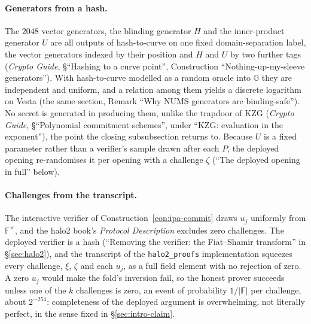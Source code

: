 \documentclass[11pt,a4paper]{article}
\theoremstyle{definition}
\newcommand{\F}{\mathbb{F}}
\newcommand{\G}{\mathbb{G}}
\begin{document}
\paragraph{Generators from a hash.}
The $2048$ vector generators, the blinding generator $H$ and the
inner-product generator $U$ are all outputs of hash-to-curve on one
fixed domain-separation label, the vector generators indexed by their
position and $H$ and $U$ by two further tags (\emph{Crypto Guide},
\S``Hashing to a curve point'', Construction ``Nothing-up-my-sleeve
generators''). With hash-to-curve modelled as a random oracle into $\G$
they are independent and uniform, and a relation among them yields a
discrete logarithm on Vesta (the same section, Remark ``Why NUMS
generators are binding-safe''). No secret is generated in producing
them, unlike the trapdoor of KZG (\emph{Crypto Guide},
\S``Polynomial commitment schemes'', under ``KZG: evaluation in the
exponent''), the point the closing subsubsection returns to. Because $U$
is a fixed parameter rather than a verifier's sample drawn after each
$P$, the deployed opening re-randomises it per opening with a
challenge $\zeta$ (``The deployed opening in full'' below).

\paragraph{Challenges from the transcript.}
The interactive verifier of Construction~\ref{con:ipa-commit} draws
$u_j$ uniformly from $\F^{\times}$, and the halo2 book's
\emph{Protocol Description} excludes zero challenges. The deployed
verifier is a hash (``Removing the verifier: the Fiat--Shamir transform''
in \S\ref{sec:halo2}), and the transcript of the
\texttt{halo2\_proofs} implementation squeezes every challenge, $\xi$,
$\zeta$ and each $u_j$, as a full field element with no rejection of
zero. A zero $u_j$ would make the fold's inversion
fail, so the honest prover succeeds unless one of the $k$ challenges
is zero, an event of probability $1/|\F|$ per challenge, about
$2^{-254}$: completeness of the deployed argument is overwhelming,
not literally perfect, in the sense fixed in \S\ref{sec:intro-claim}.
\end{document}

